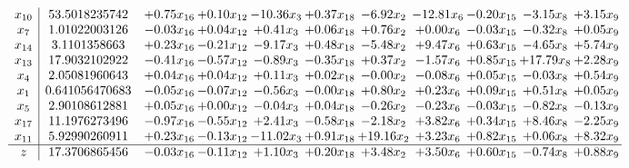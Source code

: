 \documentclass[9pt]{article}
\begin{document}
\[\begin{array}{c| c c@{\hskip 2pt} c@{\hskip 2pt} c@{\hskip 2pt} c@{\hskip 2pt} c@{\hskip 2pt} c@{\hskip 2pt} c@{\hskip 2pt} c@{\hskip 2pt} c@{\hskip 2pt} }
 x_{10}   &  53.5018235742 & +  0.75 x_{16} & +  0.10 x_{12} & -10.36 x_{3} & +  0.37 x_{18} & -6.92 x_{2} & -12.81 x_{6} & -0.20 x_{15} & -3.15 x_{8} & +  3.15 x_{9}\\
 x_{7}   &  1.01022003126 & -0.03 x_{16} & +  0.04 x_{12} & +  0.41 x_{3} & +  0.06 x_{18} & +  0.76 x_{2} & +  0.00 x_{6} & -0.03 x_{15} & -0.32 x_{8} & +  0.05 x_{9}\\
 x_{14}   &  3.1101358663 & +  0.23 x_{16} & -0.21 x_{12} & -9.17 x_{3} & +  0.48 x_{18} & -5.48 x_{2} & +  9.47 x_{6} & +  0.63 x_{15} & -4.65 x_{8} & +  5.74 x_{9}\\
 x_{13}   &  17.9032102922 & -0.41 x_{16} & -0.57 x_{12} & -0.89 x_{3} & -0.35 x_{18} & +  0.37 x_{2} & -1.57 x_{6} & +  0.85 x_{15} & + 17.79 x_{8} & +  2.28 x_{9}\\
 x_{4}   &  2.05081960643 & +  0.04 x_{16} & +  0.04 x_{12} & +  0.11 x_{3} & +  0.02 x_{18} & -0.00 x_{2} & -0.08 x_{6} & +  0.05 x_{15} & -0.03 x_{8} & +  0.54 x_{9}\\
 x_{1}   &  0.641056470683 & -0.05 x_{16} & -0.07 x_{12} & -0.56 x_{3} & -0.00 x_{18} & +  0.80 x_{2} & +  0.23 x_{6} & +  0.09 x_{15} & +  0.51 x_{8} & +  0.05 x_{9}\\
 x_{5}   &  2.90108612881 & +  0.05 x_{16} & +  0.00 x_{12} & -0.04 x_{3} & +  0.04 x_{18} & -0.26 x_{2} & -0.23 x_{6} & -0.03 x_{15} & -0.82 x_{8} & -0.13 x_{9}\\
 x_{17}   &  11.1976273496 & -0.97 x_{16} & -0.55 x_{12} & +  2.41 x_{3} & -0.58 x_{18} & -2.18 x_{2} & +  3.82 x_{6} & +  0.34 x_{15} & +  8.46 x_{8} & -2.25 x_{9}\\
 x_{11}   &  5.92990260911 & +  0.23 x_{16} & -0.13 x_{12} & -11.02 x_{3} & +  0.91 x_{18} & + 19.16 x_{2} & +  3.23 x_{6} & +  0.82 x_{15} & +  0.06 x_{8} & +  8.32 x_{9}\\
\hline
z    &  17.3706865456 & -0.03 x_{16} & -0.11 x_{12} & +  1.10 x_{3} & +  0.20 x_{18} & +  3.48 x_{2} & +  3.50 x_{6} & +  0.60 x_{15} & -0.74 x_{8} & +  0.88 x_{9}\\
\end{array}\]
\end{document}
